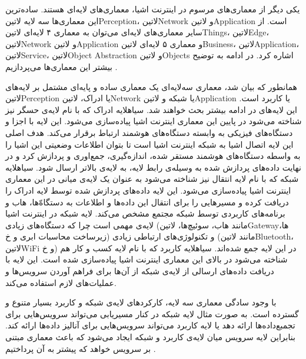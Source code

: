 یکی دیگر از معماری‌های مرسوم در اینترنت اشیا، معماری‌های لایه‌ای هستند. ساده‌ترین این معماری‌ها سه لایه ‌لاتین{Perception}، ‌لاتین{Network} و ‌لاتین{Application}
است. از سایر معماری‌های لایه‌ای می‌توان به معماری ۴ لایه‌ای ‌لاتین{Things}، ‌لاتین{Edge}، ‌لاتین{Network} و ‌لاتین{Application} و معماری ۵ لایه‌ای
‌لاتین{Business}، ‌لاتین{Application}، ‌لاتین{Service}، ‌لاتین{Object Abstraction} و ‌لاتین{Objects} اشاره کرد. در ادامه به توضیح بیشتر این معماری‌ها می‌پردازیم
.

همانطور که بیان شد، معماری سه‌لایه‌ای یک معماری ساده و پایه‌ای مشتمل بر لایه‌های ‌لاتین{Perception} یا ادراک، ‌لاتین{Network} یا شبکه و ‌لاتین{Application} یا کاربرد است.
این لایه‌های در ادامه بیشتر بحث خواهند شد.
 ‌سیاه{لایه ادراک} که با نام لایه‌ی حسگر نیز شناخته می‌شود در پایین این معماری اینترنت اشیا پیاده‌سازی می‌شود. این لایه با اجزا و دستگاه‌های فیزیکی به وابسته دستگاه‌های هوشمند ارتباط برقرار می‌کند.
هدف اصلی این لایه اتصال اشیا به شبکه اینترنت اشیا است تا بتوان اطلاعات وضعیتی این اشیا را به واسطه دستگاه‌های هوشمند مستقر شده، اندازه‌گیری، جمع‌اوری و پردازش کرد و در نهایت داده‌های پردازش شده به
وسیله‌ی رابط لایه، به لایه‌ی بالاتر ارسال شود.
 ‌سیاه{لایه شبکه} که با نام لایه انتقال نیز شناخته می‌شود به عنوان یک لایه‌ی میانی در این معماری اینترنت اشیا پیاده‌سازی می‌شود. این لایه داده‌های پردازش شده توسط لایه ادراک را دریافت کرده و
مسیرهایی را برای انتقال این داده‌ها و اطلاعات به دستگاه‌ّها، هاب و برنامه‌های کاربردی توسط شبکه مجتمع مشخص می‌کند. لایه شبکه در اینترنت اشیا لایه‌ی مهمی است چرا که دستگاه‌های زیادی (مانند
هاب، سوئیچ‌ها، ‌لاتین{Gateway}ها، زیرساخت محاسبات ابری و ‌خ) و تکنولوژی‌های ارتباطی زیادی (مانند ‌لاتین{Bluetooth}، ‌لاتین{WiFi} و ‌خ) در این لایه جمع شده‌اند.
 ‌سیاه{لایه کاربرد} که با نام لایه کسب و کار هم شناخته می‌شود در بالای این معماری اینترنت اشیا پیاده‌سازی شده است. این لایه با دریافت داده‌های ارسالی از لایه‌ی شبکه از آن‌ها برای فراهم آوردن
سرویس‌ها و عملیات‌های لازم استفاده می‌کند.

با وجود سادگی معماری سه لایه، کارکردهای لایه‌ی شبکه و کاربرد بسیار متنوع و گسترده است. به صورت مثال لایه شبکه در کنار مسیریابی می‌تواند سرویس‌هایی برای تجمبع‌داده‌ها ارائه دهد یا لایه کاربرد
می‌تواند سرویس‌هایی برای آنالیز داده‌ها ارائه کند. بنابراین لایه سرویس میان لایه‌ی کاربرد و شبکه ایجاد می‌شود که باعث معماری مبتنی بر سرویس خواهد که پیشتر به آن پرداختیم
.


